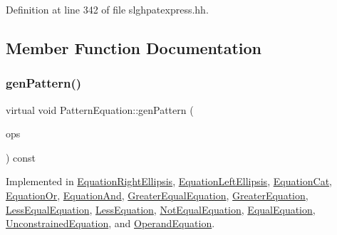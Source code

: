 Definition at line 342 of file slghpatexpress.\+hh.



\subsection{Member Function Documentation}
\mbox{\label{class_pattern_equation_a9838e5bfe5b6013c99567628a6364bfd}} 
\subsubsection{\texorpdfstring{genPattern()}{genPattern()}}
{\footnotesize\ttfamily virtual void Pattern\+Equation\+::gen\+Pattern (\begin{DoxyParamCaption}\item[{const vector$<$ \mbox{\hyperlink{class_token_pattern}{Token\+Pattern}} $>$ \&}]{ops }\end{DoxyParamCaption}) const\hspace{0.3cm}{\ttfamily [pure virtual]}}



Implemented in \mbox{\hyperlink{class_equation_right_ellipsis_ae250ac9079b2f1d60f5b295095abe36f}{Equation\+Right\+Ellipsis}}, \mbox{\hyperlink{class_equation_left_ellipsis_a8d2e9982b85b000ff611204134a01061}{Equation\+Left\+Ellipsis}}, \mbox{\hyperlink{class_equation_cat_ad5322f8ad27062ff5c195c392334b299}{Equation\+Cat}}, \mbox{\hyperlink{class_equation_or_a6fe7cf006e7c2f0861ee6cce846f9feb}{Equation\+Or}}, \mbox{\hyperlink{class_equation_and_ae32ea2fa01f596d79ead8028ff34bee4}{Equation\+And}}, \mbox{\hyperlink{class_greater_equal_equation_ac3b38fb035abd2547debc594396bf5f6}{Greater\+Equal\+Equation}}, \mbox{\hyperlink{class_greater_equation_a4ebd4be45c692f46fdfd252d2c8c3628}{Greater\+Equation}}, \mbox{\hyperlink{class_less_equal_equation_ace9862ee9b24e31d3e07b76556f3e220}{Less\+Equal\+Equation}}, \mbox{\hyperlink{class_less_equation_a6bc8fcb6385a1804b80b0329b26ef4b0}{Less\+Equation}}, \mbox{\hyperlink{class_not_equal_equation_a9c356f48a2e47ea80c215b97d0b1fc65}{Not\+Equal\+Equation}}, \mbox{\hyperlink{class_equal_equation_a39dc966c60f2cf4fa28753e3057536a0}{Equal\+Equation}}, \mbox{\hyperlink{class_unconstrained_equation_a6b6c824615f9de7fba284e940cb11299}{Unconstrained\+Equation}}, and \mbox{\hyperlink{class_operand_equation_a058969ecd084d4b79a36f0d153a3e972}{Operand\+Equation}}.

